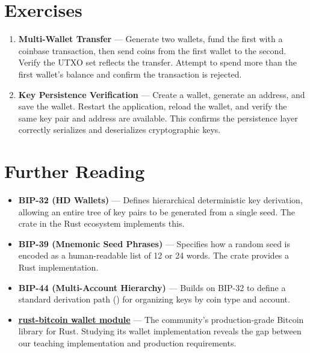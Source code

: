 \section{Exercises}
\label{sec:wallet-exercises}

\begin{enumerate}
  \item \textbf{Multi-Wallet Transfer} --- Generate two wallets, fund the first with a coinbase transaction, then send coins from the first wallet to the second. Verify the UTXO set reflects the transfer. Attempt to spend more than the first wallet's balance and confirm the transaction is rejected.

  \item \textbf{Key Persistence Verification} --- Create a wallet, generate an address, and save the wallet. Restart the application, reload the wallet, and verify the same key pair and address are available. This confirms the persistence layer correctly serializes and deserializes cryptographic keys.
\end{enumerate}

\section{Further Reading}
\label{sec:wallet-further-reading}

\begin{itemize}
  \item \textbf{BIP-32 (HD Wallets)} --- Defines hierarchical deterministic key derivation, allowing an entire tree of key pairs to be generated from a single seed. The  crate in the Rust ecosystem implements this.
  \item \textbf{BIP-39 (Mnemonic Seed Phrases)} --- Specifies how a random seed is encoded as a human-readable list of 12 or 24 words. The  crate provides a Rust implementation.
  \item \textbf{BIP-44 (Multi-Account Hierarchy)} --- Builds on BIP-32 to define a standard derivation path () for organizing keys by coin type and account.
  \item \textbf{\href{https://docs.rs/bitcoin}{rust-bitcoin wallet module}} --- The community's production-grade Bitcoin library for Rust. Studying its wallet implementation reveals the gap between our teaching implementation and production requirements.
\end{itemize}

